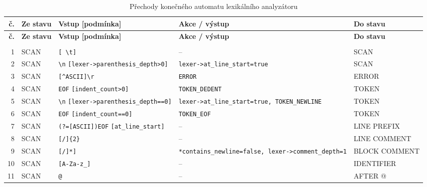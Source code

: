 \documentclass[a4paper,11pt]{article}
\begin{document}
\begin{landscape}
{\small
\setlength{\tabcolsep}{3pt}
\begin{longtable}{@{}r >{\raggedright\arraybackslash}p{4.0cm} >{\raggedright\arraybackslash}p{9.8cm} >{\raggedright\arraybackslash}p{5.4cm}>{\raggedright\arraybackslash}p{4.0cm}@{}}
\caption{Přechody konečného automatu lexikálního analyzátoru}
\label{tab:prechody}\\
\toprule
\textbf{č.} & \textbf{Ze stavu} & \textbf{Vstup [podmínka]} & \textbf{Akce / výstup} & \textbf{Do stavu} \\
\midrule
\endfirsthead
\toprule
\textbf{č.} & \textbf{Ze stavu} & \textbf{Vstup [podmínka]} & \textbf{Akce / výstup} & \textbf{Do stavu} \\
\midrule
\endhead
\bottomrule
\endfoot
\multicolumn{5}{@{}l}{\textbf{Start -- SCAN}} \\*
1 & SCAN & \texttt{{[}\ \textbackslash{}t{]}\allowbreak{}} & -- & SCAN \\
2 & SCAN & \texttt{\textbackslash{}n} \texttt{{[}lexer-{}\textgreater{}parenthesis\_depth\textgreater{}0{]}\allowbreak{}} & \texttt{lexer-{}\textgreater{}at\_line\_start=true} & SCAN \\
3 & SCAN & \texttt{{[}\textasciicircum{}ASCII{]}\allowbreak{}\textbar{}\allowbreak{}\textbackslash{}r} & \texttt{ERROR} & ERROR \\
4 & SCAN & \texttt{EOF} \texttt{{[}indent\_count\textgreater{}0{]}\allowbreak{}} & \texttt{TOKEN\_DEDENT} & TOKEN \\
5 & SCAN & \texttt{\textbackslash{}n} \texttt{{[}lexer-{}\textgreater{}parenthesis\_depth==0{]}\allowbreak{}} & \texttt{lexer-{}\textgreater{}at\_line\_start=true,\allowbreak{}\ TOKEN\_NEWLINE} & TOKEN \\
6 & SCAN & \texttt{EOF} \texttt{{[}indent\_count==0{]}\allowbreak{}} & \texttt{TOKEN\_EOF} & TOKEN \\
7 & SCAN & \texttt{(?={[}ASCII{]}\allowbreak{})\allowbreak{}\textbar{}\allowbreak{}EOF} \texttt{{[}at\_line\_start{]}\allowbreak{}} & -- & LINE PREFIX \\
8 & SCAN & \texttt{{[}/{]}\allowbreak{}\{2\}} & -- & LINE COMMENT \\
9 & SCAN & \texttt{{[}/{]}\allowbreak{}{[}*{]}\allowbreak{}} & \texttt{*contains\_newline=false,\allowbreak{}\ lexer-{}\textgreater{}comment\_depth=1} & BLOCK COMMENT \\
10 & SCAN & \texttt{{[}A-{}Za-{}z\_{]}\allowbreak{}} & -- & IDENTIFIER \\
11 & SCAN & \texttt{@} & -- & AFTER @ \\

\end{longtable}}
\end{landscape}
\end{document}
